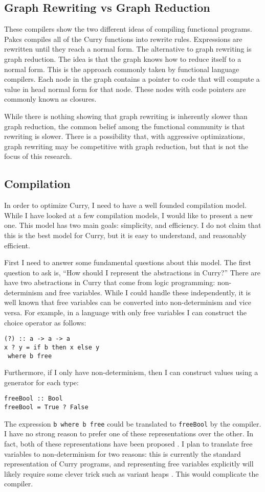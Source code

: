 \subsection{Graph Rewriting vs Graph Reduction}
These compilers show the two different ideas of compiling functional programs.
Pakcs compiles all of the Curry functions into rewrite rules.
Expressions are rewritten until they reach a normal form.
The alternative to graph rewriting is graph reduction.
The idea is that the graph knows how to reduce itself to a normal form.
This is the approach commonly taken by functional language compilers.
Each node in the graph contains a pointer to code that will compute a value in head normal form for that node.
These nodes with code pointers are commonly known as closures.

While there is nothing showing that graph rewriting is inherently slower than graph reduction,
the common belief among the functional community is that rewriting is slower.
There is a possibility that, with aggressive optimizations, graph rewriting may be competitive with graph reduction,
but that is not the focus of this research.

\subsection{Compilation}
In order to optimize Curry, I need to have a well founded compilation model.
While I have looked at a few compilation models, I would like to present a new one.
This model has two main goals: simplicity, and efficiency.
I do not claim that this is the best model for Curry, but it is easy to understand, and reasonably efficient.

First I need to answer some fundamental questions about this model.
The first question to ask is, ``How should I represent the abstractions in Curry?''
There are have two abstractions in Curry that come from logic programming:
non-determinism and free variables.
While I could handle these independently, it is well known that free variables can be converted into
non-determinism and vice versa.
For example, in a language with only free variables I can construct the choice operator as follows:
\begin{verbatim}
(?) :: a -> a -> a
x ? y = if b then x else y
 where b free
\end{verbatim}
Furthermore, if I only have non-determinism, then I can construct values using a generator for each type:
\begin{verbatim}
freeBool :: Bool
freeBool = True ? False
\end{verbatim}
The expression \texttt{b where b free} could be translated to \texttt{freeBool} by the compiler.
I have no strong reason to prefer one of these representations over the other.
In fact, both of these representations have been proposed \cite{curry_vm, Brassel2011PHD}.
I plan to translate free variables to non-determinism for two reasons:
this is currently the standard representation of Curry programs, and representing free variables explicitly
will likely require some clever trick such as variant heaps \cite{curry_vm}.
This would complicate the compiler.

